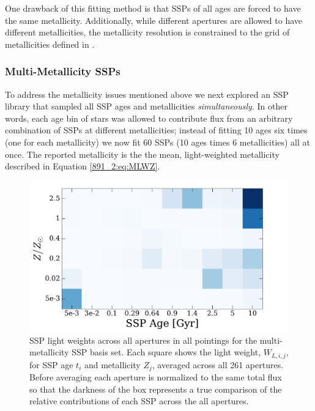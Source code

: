 One drawback of this fitting method is that SSPs of all ages are
forced to have the same metallicity. Additionally, while different
apertures are allowed to have different metallicities, the metallicity
resolution is constrained to the grid of metallicities defined in
\citet{Bruzual03}.

\subsubsection{Multi-Metallicity SSPs}
\label{891_2:sec:multi_metal}
To address the metallicity issues mentioned above we next explored an
SSP library that sampled all SSP ages and metallicities
\emph{simultaneously}. In other words, each age bin of stars was
allowed to contribute flux from an arbitrary combination of SSPs at
different metallicities; instead of fitting 10 ages six times (one for
each metallicity) we now fit 60 SSPs (10 ages times 6 metallicities)
all at once. The reported metallicity is the the mean, light-weighted
metallicity described in Equation \ref{891_2:eq:MLWZ}.

\begin{figure}
  \centering
  \includegraphics[width=\columnwidth]{891_2/figs/allZ2_all_weights.pdf}
  \caption[Example of SSP light-weights for 61 parameter
    fit]{\fixspacing\label{891_2:fig:multiZ_weights}SSP light weights
    across all apertures in all pointings for the multi-metallicity
    SSP basis set. Each square shows the light weight, $W_{L,i,j}$,
    for SSP age $t_i$ and metallicity $Z_j$, averaged across all 261
    apertures. Before averaging each aperture is normalized to the
    same total flux so that the darkness of the box represents a true
    comparison of the relative contributions of each SSP across the
    all apertures.}
\end{figure}

